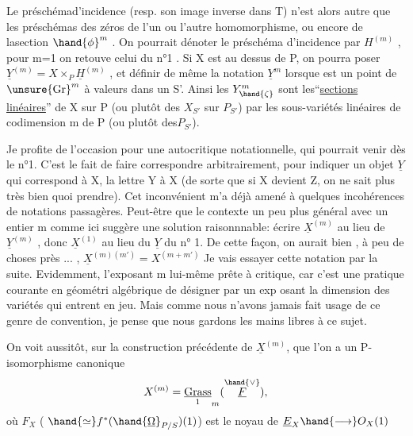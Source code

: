 
Le préschémad'incidence  (resp. son image inverse dans T) n'est alors
autre que les préschémas des zéros de l'un ou l'autre homomorphisme,
ou encore de lasection $\hand{\phi}^{m}$ .  On pourrait dénoter le préschéma
d'incidence par $H^{(m)}$ , pour m=1 on retouve celui du n°1 .  Si X est
au dessus de P, on pourra poser $\underline{Y}^{(m)} = X\times_{P} \underline{H}^{(m)}$ ,  et définir de même
la notation $\underline{Y}^{m}$ lorsque \hand{$\zeta$} est un point de $\unsure{\mathrm{Gr}}^{m}$ à valeurs dans un S'.
Ainsi les  $Y^{m}_{\hand{\zeta}}$  sont les``\uline{sections} \uline{linéaires}''  de X sur P (ou plutôt des
$X_{S'}$ sur $P_{S'}$)   par les sous-variétés linéaires de codimension m de P (ou
plutôt des$P_{S'}$).

\placedmargin{$|$}Je profite de l'occasion pour une  autocritique notationnelle,
qui pourrait venir dès le n°1. C'est le fait  de faire correspondre
arbitrairement, pour indiquer un objet $\underline{Y}$ qui correspond à X, la lettre
Y à X  (de sorte que si X devient Z, on ne sait plus très bien quoi
prendre). Cet inconvénient m'a déjà amené à quelques incohérences de
notations passagères.  Peut-être que le contexte un peu plus général
avec un entier m comme ici suggère une solution raisonnnable: écrire
$\underline{X}^{(m)}$ au lieu de  $\underline{Y}^{(m)}$ , donc  $\underline{X}^{(1)}$ au lieu du  $\underline{Y}$  du n° 1. De cette
façon, on  aurait bien , à peu de choses près ... ,  $\underline{X}^{(m)(m')} = X^{(m+m')}$
Je vais essayer cette notation par la suite.  Evidemment, l'exposant m
lui-même prête à critique, car  c'est une pratique courante en géométri
algébrique de désigner par un exp osant la dimension des variétés qui
entrent en jeu. Mais comme nous n'avons jamais fait usage de ce genre
de convention, je pense que nous gardons les mains libres à ce sujet.

On voit aussitôt, sur la construction précédente de $\underline{X}^{(m)}$, que
l'on a un P-isomorphisme canonique
\[ X^{(m)} = \underset{1}{\underline{\mathrm{Grass}}}_{m}(\overset{\hand{\vee}}{\underline{F}}) , \]
où  $F_{X}$  ( $\hand{\simeq} f^{*}(\hand{\underline{\Omega}}_{P/S})(1)$)   est le noyau de  $\underline{E}_{X} \hand{\longrightarrow} O_{X}(1)$\hand{,}

